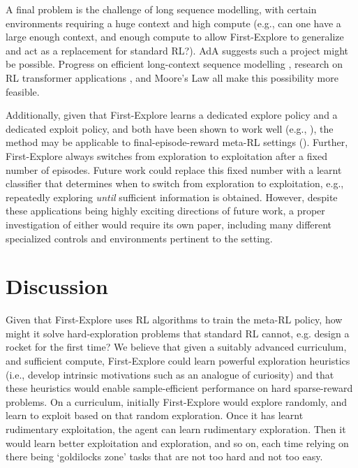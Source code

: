 \documentclass{article}
\begin{document}
A final problem is the challenge of long sequence modelling, with certain environments requiring a huge context and high compute (e.g., can one have a large enough context, and enough compute to allow First-Explore to generalize and act as a replacement for standard RL?). AdA \citep{adaptiveagentteam2023humantimescale} suggests such a project might be possible. Progress on efficient long-context sequence modelling \citep{tay2020long, gu2021efficiently}, research on RL transformer applications \citep{laskin2022incontext, chen2021decision}, and Moore's Law all make this possibility more feasible.

Additionally, given that First-Explore learns a dedicated explore policy and a dedicated exploit policy, and both have been shown to work well (e.g., ), the method may be applicable to final-episode-reward meta-RL settings (). Further, First-Explore always switches from exploration to exploitation after a fixed number of episodes. Future work could replace this fixed number with a learnt classifier that determines when to switch from exploration to exploitation, e.g., repeatedly exploring \emph{until} sufficient information is obtained. However, despite these applications being highly exciting directions of future work, a proper investigation of either would require its own paper, including many different specialized controls and environments pertinent to the setting.

\FloatBarrier
\section{Discussion}

Given that First-Explore uses RL algorithms to train the meta-RL policy, how might it solve hard-exploration problems that standard RL cannot, e.g. design a rocket for the first time? We believe that given a suitably advanced curriculum, and sufficient compute, First-Explore could learn powerful exploration heuristics (i.e., develop intrinsic motivations such as an analogue of curiosity) and that these heuristics would enable sample-efficient performance on hard sparse-reward problems. On a curriculum, initially First-Explore would explore randomly, and learn to exploit based on that random exploration. Once it has learnt rudimentary exploitation, the agent can learn rudimentary exploration. Then it would learn better exploitation and exploration, and so on, each time relying on there being `goldilocks zone' tasks \citep{POET} that are not too hard and not too easy.
\end{document}
